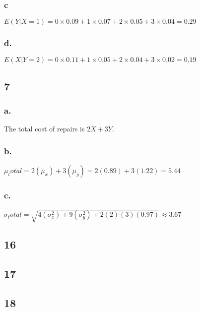 \documentclass[11pt]{article}
\begin{document}
\subsubsection{c}
$E(Y|X=1) = 0 \times 0.09 + 1 \times 0.07 + 2 \times 0.05 + 3 \times 0.04 = 0.29$

\subsubsection{d.}
$E(X|Y=2) = 0 \times 0.11 + 1 \times 0.05 + 2 \times 0.04 + 3 \times 0.02 = 0.19$

\subsection{7}
\subsubsection{a.}
The total cost of repairs is $2X+3Y$. 

\subsubsection{b.}
$\mu_total = 2(\mu_x) + 3(\mu_y) = 2(0.89)+3(1.22) = 5.44$

\subsubsection{c.}
$\sigma_total = \sqrt{4(\sigma_x^2) + 9(\sigma_y^2) + 2(2)(3)(0.97)} \approx 3.67$

\subsection{16}
\subsection{17}
\subsection{18}
\end{document}
